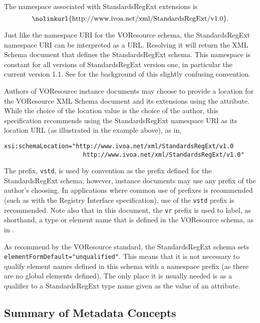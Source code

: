 \documentclass[11pt,a4paper]{ivoa}
\begin{document}
The namespace associated with StandardsRegExt extensions is
$$
\hbox{\nolinkurl{http://www.ivoa.net/xml/StandardsRegExt/v1.0}.}
$$

Just like the namespace URI for the VOResource schema, the
StandardsRegExt namespace URI can be interpreted as a URL.  Resolving it
will return the XML Schema document
that defines the StandardsRegExt schema.  This namespace is constant for
all versions of StandardsRegExt version one, in particular the current
version 1.1.  See \citet{2018ivoa.spec.0529H} for the background of this
slightly confusing convention.

Authors of VOResource instance documents may choose to
provide a location for the VOResource XML Schema document and its
extensions using the
 attribute.  While the choice of
the location value is the choice of the author, this specification
recommends using the StandardsRegExt namespace URI as its location URL
(as illustrated in the example above), as in,



\begin{lstlisting}[basicstyle=\ttfamily\footnotesize]
xsi:schemaLocation="http://www.ivoa.net/xml/StandardsRegExt/v1.0
                      http://www.ivoa.net/xml/StandardsRegExt/v1.0"
\end{lstlisting}

The prefix, \texttt{vstd}, is used by convention as the
prefix defined for the StandardsRegExt schema; however, instance documents
may use any prefix of the author's choosing.  In applications where
common use of prefixes is recommended (such as with the Registry
Interface specification), use of the
\texttt{vstd} prefix is recommended.  Note also that in this
document, the \texttt{vr} prefix is used to label, as shorthand, a
type or element name that is defined in the VOResource schema, as in
. 



As recommend by the VOResource standard, the
StandardsRegExt schema sets \verb|elementFormDefault="unqualified"|.
This means that it is not necessary to qualify element names defined
in this schema with a namespace prefix (as there are no global
elements defined).  The only place it is usually needed is as a
qualifier to a StandardsRegExt type name given as the value of an
 attribute.  



\subsection{Summary of Metadata Concepts}
\end{document}

